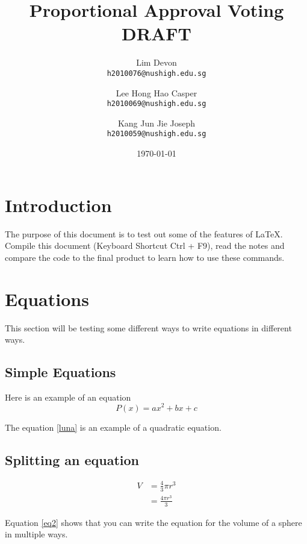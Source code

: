 \documentclass{article}
\title{Proportional Approval Voting\\DRAFT}
\author{
  Lim Devon\\
  \texttt{h2010076@nushigh.edu.sg}
  \and
  Lee Hong Hao Casper\\
  \texttt{h2010069@nushigh.edu.sg}
  \and
  Kang Jun Jie Joseph\\
  \texttt{h2010059@nushigh.edu.sg}
}
\date{\today}
\begin{document}
\maketitle

\section{Introduction}
The purpose of this document is to test out some of the features of \LaTeX{}. Compile this document (Keyboard Shortcut Ctrl + F9), read the notes and compare the code to the final product to learn how to use these commands.

\section{Equations}
This section will be testing some different ways to write equations in different ways. 

\subsection{Simple Equations}
Here is an example of an equation
\begin{equation} \label{luna}
P(x)=ax^2+bx+c
\end{equation}

The equation \ref{luna} is an example of a quadratic equation.

\subsection{Splitting an equation}

\begin{equation}\label{eq2}
\begin{split}
V&=\frac{4}{3}\pi r^3 \\
&= \frac{4\pi r^3}{3}
\end{split}
\end{equation}

Equation \ref{eq2} shows that you can write the equation for the volume of a sphere in multiple ways.
\end{document}

